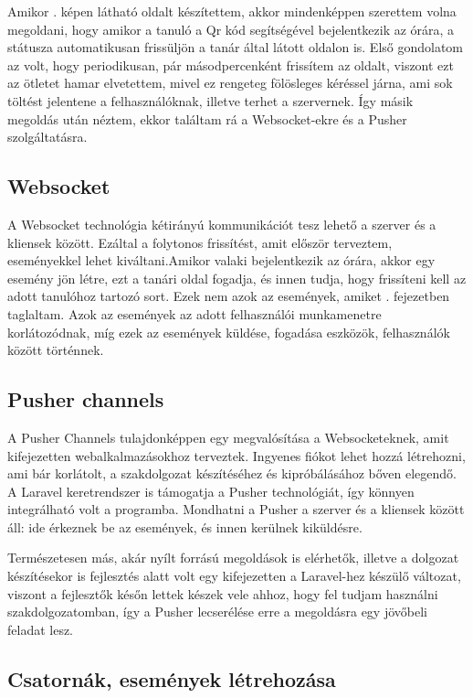 \documentclass[
]{thesis-ekf}
\theoremstyle{definition}
\theoremstyle{remark}
\begin{document}
Amikor . képen látható oldalt készítettem, akkor mindenképpen szerettem volna megoldani, hogy amikor a tanuló a Qr kód segítségével bejelentkezik az órára, a státusza automatikusan frissüljön a tanár által látott oldalon is. Első gondolatom az volt, hogy periodikusan, pár másodpercenként frissítem az oldalt, viszont ezt az ötletet hamar elvetettem, mivel ez rengeteg fölösleges kéréssel járna, ami sok töltést jelentene a felhasználóknak, illetve terhet a szervernek. Így másik megoldás után néztem, ekkor találtam rá a Websocket-ekre és a Pusher szolgáltatásra.

\subsection{Websocket}

A Websocket technológia kétirányú kommunikációt tesz lehető a szerver és a kliensek között. Ezáltal a folytonos frissítést, amit először terveztem, eseményekkel lehet kiváltani.\cite{websocket}Amikor valaki bejelentkezik az órára, akkor egy esemény jön létre, ezt a tanári oldal fogadja, és innen tudja, hogy frissíteni kell az adott tanulóhoz tartozó sort. Ezek nem azok az események, amiket . fejezetben taglaltam. Azok az események az adott felhasználói munkamenetre korlátozódnak, míg ezek az események küldése, fogadása eszközök, felhasználók között történnek.

\subsection{Pusher channels}

A Pusher Channels\cite{pusher} tulajdonképpen egy megvalósítása a Websocketeknek, amit kifejezetten webalkalmazásokhoz terveztek. Ingyenes fiókot lehet hozzá létrehozni, ami bár korlátolt, a szakdolgozat készítéséhez és kipróbálásához bőven elegendő. A Laravel keretrendszer is támogatja a Pusher technológiát, így könnyen integrálható volt a programba. Mondhatni a Pusher a szerver és a kliensek között áll: ide érkeznek be az események, és innen kerülnek kiküldésre.

Természetesen más, akár nyílt forrású megoldások is elérhetők, illetve a dolgozat készítésekor is fejlesztés alatt volt egy kifejezetten a Laravel-hez készülő változat, viszont a fejlesztők későn lettek készek vele ahhoz, hogy fel tudjam használni szakdolgozatomban, így a Pusher lecserélése erre a megoldásra egy jövőbeli feladat lesz.

\subsection{Csatornák, események létrehozása}
\end{document}
